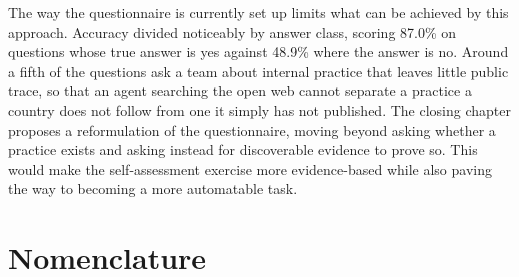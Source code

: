 The way the questionnaire is currently set up limits what can be achieved by this approach. Accuracy divided noticeably by answer class, scoring 87.0\% on questions whose true answer is yes against 48.9\% where the answer is no. Around a fifth of the questions ask a team about internal practice that leaves little public trace, so that an agent searching the open web cannot separate a practice a country does not follow from one it simply has not published. The closing chapter proposes a reformulation of the questionnaire, moving beyond asking whether a practice exists and asking instead for discoverable evidence to prove so. This would make the self-assessment exercise more evidence-based while also paving the way to becoming a more automatable task.

\chapter*{Nomenclature}

